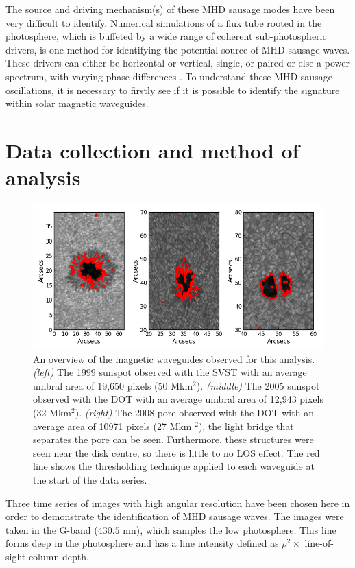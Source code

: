 	The source and driving mechanism(s) of these MHD sausage modes have been very difficult to identify.
	Numerical simulations of a flux tube rooted in the photosphere, which is buffeted by a wide range of coherent sub-photospheric drivers, is one method for identifying the potential source of MHD sausage waves.
	These drivers can either be horizontal or vertical, single, or paired or else a power spectrum, with varying phase differences \citep[see e.g.][]{malins,khomenko,fedun2,fedun1,Vigeesh2012}.
	To understand these MHD sausage oscillations, it is necessary to firstly see if it is possible to identify the signature within solar magnetic waveguides.
	
\section{Data collection and method of analysis}

	\begin{figure}
        
		\centering
		\includegraphics[width=\textwidth]{overview.png}
		\caption{
		An overview of the magnetic waveguides observed for this analysis.
		\textit{(left)} The 1999 sunspot observed with the SVST with an average umbral area of 19,650 pixels (50 Mkm$^{2}$).
		\textit{(middle)} The 2005 sunspot observed with the DOT with an average umbral area of 12,943 pixels (32 Mkm$^{2}$).
		\textit{(right)} The 2008 pore observed with the DOT with an average area of 10971 pixels (27 Mkm $^{2}$), the light bridge that separates the pore can be seen.
		Furthermore, these structures were seen near the disk centre, so there is little to no LOS effect.
		The red line shows the thresholding technique applied to each waveguide at the start of the data series.}
		\label{images}
	\end{figure}

	Three time series of images with high angular resolution have been chosen here in order to demonstrate the identification of MHD sausage waves.
	The images were taken in the G-band ($430.5$ nm), which samples the low photosphere.
	This line forms deep in the photosphere and has a line intensity defined as $\rho{^2} \times$ line-of-sight column depth.
	

